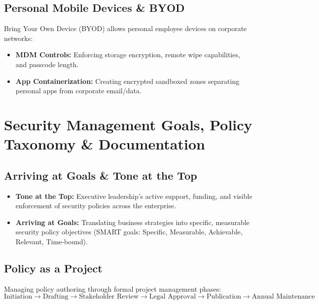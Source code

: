 \documentclass[12pt,a4paper]{article}
\begin{document}
\subsection{Personal Mobile Devices \& BYOD}
Bring Your Own Device (BYOD) allows personal employee devices on corporate networks:
\begin{itemize}[leftmargin=*, itemsep=3pt]
  \item \textbf{MDM Controls:} Enforcing storage encryption, remote wipe capabilities, and passcode length.
  \item \textbf{App Containerization:} Creating encrypted sandboxed zones separating personal apps from corporate email/data.
\end{itemize}

\section{Security Management Goals, Policy Taxonomy \& Documentation}

\subsection{Arriving at Goals \& Tone at the Top}
\begin{itemize}[leftmargin=*, itemsep=3pt]
  \item \textbf{Tone at the Top:} Executive leadership's active support, funding, and visible enforcement of security policies across the enterprise.
  \item \textbf{Arriving at Goals:} Translating business strategies into specific, measurable security policy objectives (SMART goals: Specific, Measurable, Achievable, Relevant, Time-bound).
\end{itemize}

\subsection{Policy as a Project}
Managing policy authoring through formal project management phases:
\[
\text{Initiation} \longrightarrow \text{Drafting} \longrightarrow \text{Stakeholder Review} \longrightarrow \text{Legal Approval} \longrightarrow \text{Publication} \longrightarrow \text{Annual Maintenance}
\]
\end{document}
